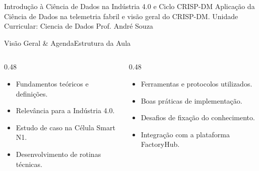 
\senaicover
  {Introdução à Ciência de Dados na Indústria 4.0 e Ciclo CRISP-DM}
  {Aplicação da Ciência de Dados na telemetria fabril e visão geral do CRISP-DM.}
  {Unidade Curricular: Ciencia de Dados}
  {Prof. André Souza}

\begin{senaiframe}{Visão Geral \& Agenda}{Estrutura da Aula}
  \begin{columns}[t]
    \begin{column}{0.48\textwidth}
      \begin{tcolorbox}[senaibluecard, title={1. Conceitos Chave}]
        \begin{itemize}
          \item Fundamentos teóricos e definições.
          \item Relevância para a Indústria 4.0.
        \end{itemize}
      \end{tcolorbox}
      \vspace{4pt}
      \begin{tcolorbox}[senaiambercard, title={3. Aplicação Prática}]
        \begin{itemize}
          \item Estudo de caso na Célula Smart N1.
          \item Desenvolvimento de rotinas técnicas.
        \end{itemize}
      \end{tcolorbox}
    \end{column}
    \begin{column}{0.48\textwidth}
      \begin{tcolorbox}[senairedcard, title={2. Detalhamento Técnico}]
        \begin{itemize}
          \item Ferramentas e protocolos utilizados.
          \item Boas práticas de implementação.
        \end{itemize}
      \end{tcolorbox}
      \vspace{4pt}
      \begin{tcolorbox}[senaigreencard, title={4. Exercícios \& Avaliação}]
        \begin{itemize}
          \item Desafios de fixação do conhecimento.
          \item Integração com a plataforma FactoryHub.
        \end{itemize}
      \end{tcolorbox}
    \end{column}
  \end{columns}
\end{senaiframe}

